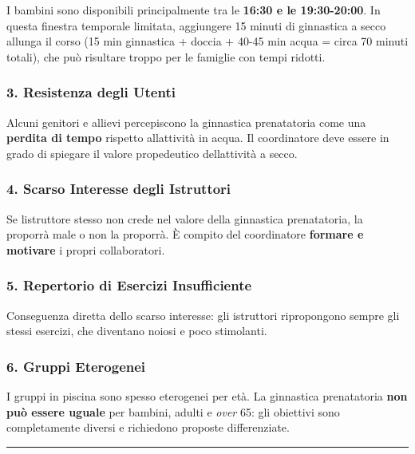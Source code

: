 \documentclass[a4paper,11pt]{article}
\begin{document}
I bambini sono disponibili principalmente tra le \textbf{16:30 e le
      19:30-20:00}. In questa finestra temporale limitata, aggiungere 15
minuti di ginnastica a secco allunga il corso (15 min ginnastica +
doccia + 40-45 min acqua = circa 70 minuti totali), che può risultare
troppo per le famiglie con tempi ridotti.

\subsubsection{3. Resistenza degli
      Utenti}\label{resistenza-degli-utenti}

Alcuni genitori e allievi percepiscono la ginnastica prenatatoria come
una \textbf{perdita di tempo} rispetto all\textquotesingle attività in
acqua. Il coordinatore deve essere in grado di spiegare il valore
propedeutico dell\textquotesingle attività a secco.

\subsubsection{4. Scarso Interesse degli
      Istruttori}\label{scarso-interesse-degli-istruttori}

Se l\textquotesingle istruttore stesso non crede nel valore della
ginnastica prenatatoria, la proporrà male o non la proporrà. È compito
del coordinatore \textbf{formare e motivare} i propri collaboratori.

\subsubsection{5. Repertorio di Esercizi
      Insufficiente}\label{repertorio-di-esercizi-insufficiente}

Conseguenza diretta dello scarso interesse: gli istruttori ripropongono
sempre gli stessi esercizi, che diventano noiosi e poco stimolanti.

\subsubsection{6. Gruppi Eterogenei}\label{gruppi-eterogenei}

I gruppi in piscina sono spesso eterogenei per età. La ginnastica
prenatatoria \textbf{non può essere uguale} per bambini, adulti e
\emph{over} 65: gli obiettivi sono completamente diversi e richiedono
proposte differenziate.

\begin{center}\rule{0.5\linewidth}{0.5pt}\end{center}
\end{document}
